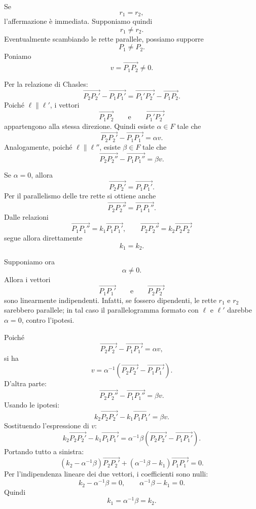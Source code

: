 \documentclass[a4paper]{article}
\begin{document}
\begin{snippetproof}{}
    Se
    \[
        r_1=r_2,
    \]
    l'affermazione è immediata. Supponiamo quindi
    \[
        r_1\neq r_2.
    \]
    Eventualmente scambiando le rette parallele, possiamo supporre
    \[
        P_1\neq P_2.
    \]
    Poniamo
    \[
        v=\overrightarrow{P_1P_2}\neq 0.
    \]

    Per la relazione di Chasles:
    \[
        \overrightarrow{P_2P_2'}-\overrightarrow{P_1P_1'}
        =
        \overrightarrow{P_1'P_2'}-\overrightarrow{P_1P_2}.
    \]
    Poiché \(\ell\parallel \ell'\), i vettori
    \[
        \overrightarrow{P_1P_2}
        \qquad
        \text{e}
        \qquad
        \overrightarrow{P_1'P_2'}
    \]
    appartengono alla stessa direzione. Quindi esiste \(\alpha\in F\) tale che
    \[
        \overrightarrow{P_2P_2'}-\overrightarrow{P_1P_1'}=\alpha v.
    \]
    Analogamente, poiché \(\ell\parallel\ell''\), esiste \(\beta\in F\) tale che
    \[
        \overrightarrow{P_2P_2''}-\overrightarrow{P_1P_1''}=\beta v.
    \]

    Se \(\alpha=0\), allora
    \[
        \overrightarrow{P_2P_2'}=\overrightarrow{P_1P_1'}.
    \]
    Per il parallelismo delle tre rette si ottiene anche
    \[
        \overrightarrow{P_2P_2''}=\overrightarrow{P_1P_1''}.
    \]
    Dalle relazioni
    \[
        \overrightarrow{P_1P_1''}=k_1\overrightarrow{P_1P_1'},
        \qquad
        \overrightarrow{P_2P_2''}=k_2\overrightarrow{P_2P_2'}
    \]
    segue allora direttamente
    \[
        k_1=k_2.
    \]

    Supponiamo ora
    \[
        \alpha\neq 0.
    \]
    Allora i vettori
    \[
        \overrightarrow{P_1P_1'}
        \qquad
        \text{e}
        \qquad
        \overrightarrow{P_2P_2'}
    \]
    sono linearmente indipendenti. Infatti, se fossero dipendenti, le rette \(r_1\) e \(r_2\) sarebbero parallele; in tal caso il parallelogramma formato con \(\ell\) e \(\ell'\) darebbe \(\alpha=0\), contro l'ipotesi.

    Poiché
    \[
        \overrightarrow{P_2P_2'}-\overrightarrow{P_1P_1'}=\alpha v,
    \]
    si ha
    \[
        v=\alpha^{-1}
        \left(
            \overrightarrow{P_2P_2'}-\overrightarrow{P_1P_1'}
        \right).
    \]
    D'altra parte:
    \[
        \overrightarrow{P_2P_2''}-\overrightarrow{P_1P_1''}=\beta v.
    \]
    Usando le ipotesi:
    \[
        k_2\overrightarrow{P_2P_2'}
        -
        k_1\overrightarrow{P_1P_1'}
        =
        \beta v.
    \]
    Sostituendo l'espressione di \(v\):
    \[
        k_2\overrightarrow{P_2P_2'}
        -
        k_1\overrightarrow{P_1P_1'}
        =
        \alpha^{-1}\beta
        \left(
            \overrightarrow{P_2P_2'}-\overrightarrow{P_1P_1'}
        \right).
    \]
    Portando tutto a sinistra:
    \[
        \left(k_2-\alpha^{-1}\beta\right)
        \overrightarrow{P_2P_2'}
        +
        \left(\alpha^{-1}\beta-k_1\right)
        \overrightarrow{P_1P_1'}
        =
        0.
    \]
    Per l'indipendenza lineare dei due vettori, i coefficienti sono nulli:
    \[
        k_2-\alpha^{-1}\beta=0,
        \qquad
        \alpha^{-1}\beta-k_1=0.
    \]
    Quindi
    \[
        k_1=\alpha^{-1}\beta=k_2.
    \]
\end{snippetproof}
\end{document}
